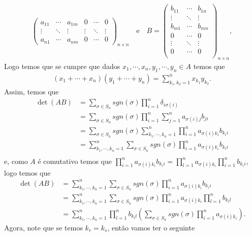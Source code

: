 \begin{homeworkProblem}
\begin{solution}
\begin{align*}
\begin{pmatrix}
    a_{11} & \cdots & a_{1m} & 0 & \cdots & 0\\
    \vdots & \ddots & \vdots & \vdots & \ddots & \vdots\\
    a_{n1} & \cdots & a_{nm} & 0 & \cdots & 0
  \end{pmatrix}_{n\times n}\quad\text{e}\quad B=\begin{pmatrix}
    b_{11} & \cdots & b_{1n}\\
    \vdots & \ddots & \vdots\\
    b_{m1} & \cdots & b_{mn}\\
    0      & \cdots & 0\\
    \vdots & \ddots & \vdots\\
    0      & \cdots & 0\\
  \end{pmatrix}_{n\times n},
\end{align*}
Logo temos que se cumpre que dados $x_1,\cdots,x_n,y_1,\cdots,y_n\in A$ temos que
\begin{align*}
  (x_1+\cdots+x_n)(y_1+\cdots+y_n)=\sum_{k_1,k_2=1}^{n}x_{k_1}y_{k_2}.
\end{align*}
Assim, temos que
\begin{align*}
  \det(AB)&=\sum_{\sigma\in S_{n}}sgn(\sigma)\prod_{i=1}^{n}\delta_{i\sigma(i)}\\
  &=\sum_{\sigma\in S_{n}}sgn(\sigma)\prod_{i=1}^{n}\sum_{j=1}^{n}a_{\sigma(i)j}b_{ji}\\
  &=\sum_{\sigma\in S_{n}}sgn(\sigma)\sum_{k_1,\cdots,k_n=1}^{n}\prod_{i=1}^{n}a_{\sigma(i)k_{i}}b_{k_{i}i}\\
  &=\sum_{k_1,\cdots,k_n=1}^{n}\sum_{\sigma\in S_{n}}sgn(\sigma)\prod_{i=1}^{n}a_{\sigma(i)k_{i}}b_{k_{i}i}\\
\end{align*}
e, como $A$ é comutativo temos que $\prod_{i=1}^{n}a_{\sigma(i)k_i}b_{k_ii}=\prod_{l=1}^{n}a_{\sigma(i)k_i}\prod_{i=1}^{n}b_{k_ii}$, logo temos que
\begin{align*}
  \det(AB)&=\sum_{k_1,\cdots,k_n=1}^{n}\sum_{\sigma\in S_{n}}sgn(\sigma)\prod_{i=1}^{n}a_{\sigma(i)k_{i}}b_{k_{i}i}\\
  &=\sum_{k_1,\cdots,k_n=1}^{n}\sum_{\sigma\in S_{n}}sgn(\sigma)\prod_{i=1}^{n}a_{\sigma(i)k_{i}}\prod_{l=1}^{n}b_{k_{l}l}\\
  &=\sum_{k_1,\cdots,k_n=1}^{n}\prod_{l=1}^{n}b_{k_{l}l}\left(\sum_{\sigma\in S_{n}}sgn(\sigma)\prod_{i=1}^{n}a_{\sigma(i)k_{i}}\right).
\end{align*}
Agora, note que se temos $k_r=k_s$, então vamos ter o seguinte

\end{solution}
\end{homeworkProblem}
